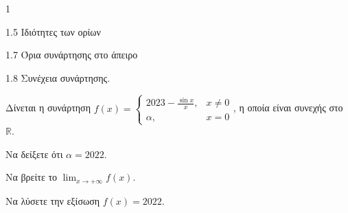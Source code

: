 \begin{ylh}{1}
    \item 1.5 Ιδιότητες των ορίων
    \item 1.7 Όρια συνάρτησης στο άπειρο
    \item 1.8 Συνέχεια συνάρτησης.
\end{ylh}
Δίνεται η συνάρτηση $f(x) = \begin{cases} 2023-\frac{\sin x}{x}, & x \neq 0 \\ \alpha, & x=0 \end{cases}$, η οποία είναι συνεχής στο $\mathbb{R}$.
\begin{alist}
\item Να δείξετε ότι $\alpha = 2022$. 
\item Να βρείτε το $\lim_{x \to +\infty} f(x)$. 
\item Να λύσετε την εξίσωση $f(x) = 2022$. 
\end{alist}
